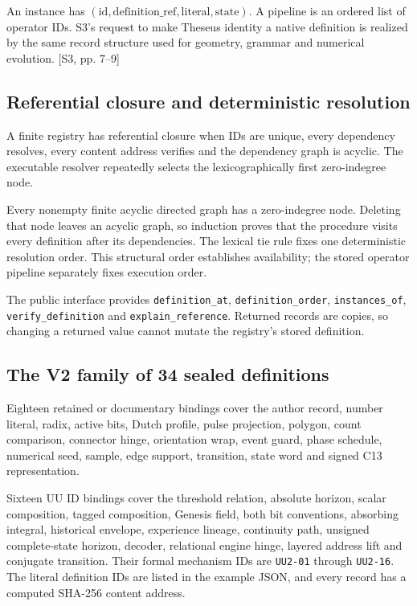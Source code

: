 \documentclass[11pt,a4paper]{article}
\numberwithin{equation}{section}
\newcommand{\src}[2]{{\sffamily\small\color{slate}[#1, #2]}}
\begin{document}
An instance has $(\mathrm{id},\mathrm{definition\_ref},\mathrm{literal},\mathrm{state})$. A pipeline is an ordered list of operator IDs. S3's request to make Theseus identity a native definition is realized by the same record structure used for geometry, grammar and numerical evolution. \src{S3}{pp. 7--9}

\subsection{Referential closure and deterministic resolution}
A finite registry has referential closure when IDs are unique, every dependency resolves, every content address verifies and the dependency graph is acyclic. The executable resolver repeatedly selects the lexicographically first zero-indegree node.

Every nonempty finite acyclic directed graph has a zero-indegree node. Deleting that node leaves an acyclic graph, so induction proves that the procedure visits every definition after its dependencies. The lexical tie rule fixes one deterministic resolution order. This structural order establishes availability; the stored operator pipeline separately fixes execution order.

The public interface provides \texttt{definition\_at}, \texttt{definition\_order}, \texttt{instances\_of}, \texttt{verify\_definition} and \texttt{explain\_reference}. Returned records are copies, so changing a returned value cannot mutate the registry's stored definition.

\subsection{The V2 family of 34 sealed definitions}
Eighteen retained or documentary bindings cover the author record, number literal, radix, active bits, Dutch profile, pulse projection, polygon, count comparison, connector hinge, orientation wrap, event guard, phase schedule, numerical seed, sample, edge support, transition, state word and signed C13 representation.

Sixteen UU ID bindings cover the threshold relation, absolute horizon, scalar composition, tagged composition, Genesis field, both bit conventions, absorbing integral, historical envelope, experience lineage, continuity path, unsigned complete-state horizon, decoder, relational engine hinge, layered address lift and conjugate transition. Their formal mechanism IDs are \texttt{UU2-01} through \texttt{UU2-16}. The literal definition IDs are listed in the example JSON, and every record has a computed SHA-256 content address.
\end{document}
